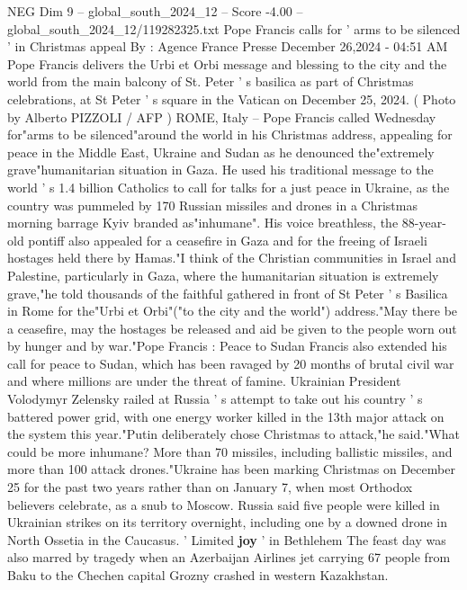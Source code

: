\begin{textsample}{NEG Dim 9 – global\_south\_2024\_12 – Score -4.00 – global\_south\_2024\_12/119282325.txt}  \label{ex:f9_neg_218}
Pope Francis calls for ' arms to be silenced ' in Christmas appeal By : Agence France Presse December 26,2024 - 04:51 AM Pope Francis delivers the Urbi et Orbi message and blessing to the city and the world from the main balcony of St.
Peter ' s basilica as part of Christmas celebrations, at St Peter ' s square in the Vatican on December 25, 2024. ( Photo by Alberto PIZZOLI / AFP ) ROME, Italy -- Pope Francis called Wednesday for"arms to be silenced"around the world in his Christmas address, appealing for peace in the Middle East, Ukraine and Sudan as he denounced the"extremely grave"humanitarian situation in Gaza.
He used his traditional message to the world ' s 1.4 billion Catholics to call for talks for a just peace in Ukraine, as the country was pummeled by 170 Russian missiles and drones in a Christmas morning barrage Kyiv branded as"inhumane".
His voice breathless, the 88-year-old pontiff also appealed for a ceasefire in Gaza and for the freeing of Israeli hostages held there by Hamas."I think of the Christian communities in Israel and Palestine, particularly in Gaza, where the humanitarian situation is extremely grave,"he told thousands of the faithful gathered in front of St Peter ' s Basilica in Rome for the"Urbi et Orbi"("to the city and the world") address."May there be a ceasefire, may the hostages be released and aid be given to the people worn out by hunger and by war."Pope Francis : Peace to Sudan Francis also extended his call for peace to Sudan, which has been ravaged by 20 months of brutal civil war and where millions are under the threat of famine.
Ukrainian President Volodymyr Zelensky railed at Russia ' s attempt to take out his country ' s battered power grid, with one energy worker killed in the 13th major attack on the system this year."Putin deliberately chose Christmas to attack,"he said."What could be more inhumane?
More than 70 missiles, including ballistic missiles, and more than 100 attack drones."Ukraine has been marking Christmas on December 25 for the past two years rather than on January 7, when most Orthodox believers celebrate, as a snub to Moscow.
Russia said five people were killed in Ukrainian strikes on its territory overnight, including one by a downed drone in North Ossetia in the Caucasus. ' Limited \textbf{joy} ' in Bethlehem The feast day was also marred by tragedy when an Azerbaijan Airlines jet carrying 67 people from Baku to the Chechen capital Grozny crashed in western Kazakhstan.

\end{textsample}
